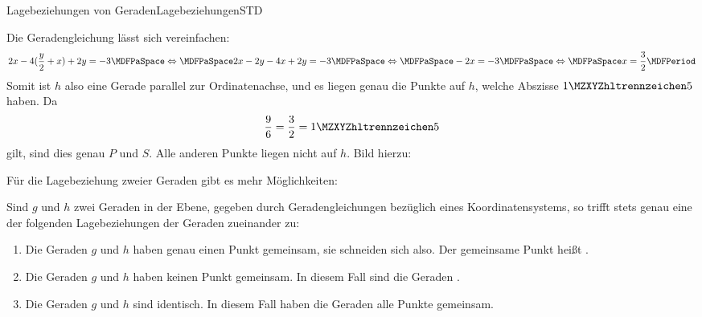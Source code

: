 \begin{MXContent}{Lagebeziehungen von Geraden}{Lagebeziehungen}{STD}
\begin{MExercise}
\begin{MHint}{\iSolution}
Die Geradengleichung lässt sich vereinfachen:
\[
 2x-4(\frac{y}{2}+x)+2y=-3\MDFPaSpace\Leftrightarrow\MDFPaSpace2x-2y-4x+2y=-3\MDFPaSpace\Leftrightarrow\MDFPaSpace-2x=-3\MDFPaSpace\Leftrightarrow\MDFPaSpace x=\frac{3}{2}\MDFPeriod
\]
Somit ist $h$ also eine Gerade parallel zur Ordinatenachse, und es liegen genau die Punkte auf $h$, welche Abszisse $\MZahl{1}{5}$ haben. Da
\[
 \frac{9}{6} = \frac{3}{2} = \MZahl{1}{5}
\]
gilt, sind dies genau $P$ und $S$. Alle anderen Punkte liegen nicht auf $h$. Bild hierzu:
\begin{center}
\end{center} 
\end{MHint}

\end{MExercise}

Für die Lagebeziehung zweier Geraden gibt es mehr Möglichkeiten:

\begin{MInfo}
Sind $g$ und $h$ zwei Geraden in der Ebene, gegeben durch Geradengleichungen bezüglich eines Koordinatensystems, so trifft stets genau eine der folgenden Lagebeziehungen der Geraden zueinander zu:
\begin{enumerate}
 \item Die Geraden $g$ und $h$ haben genau einen Punkt gemeinsam, sie schneiden sich also. Der gemeinsame Punkt heißt .
 \item Die Geraden $g$ und $h$ haben keinen Punkt gemeinsam. In diesem Fall sind die Geraden .
 \item Die Geraden $g$ und $h$ sind identisch. In diesem Fall haben die Geraden alle Punkte gemeinsam.
\end{enumerate}
\end{MInfo}


\end{MXContent}
